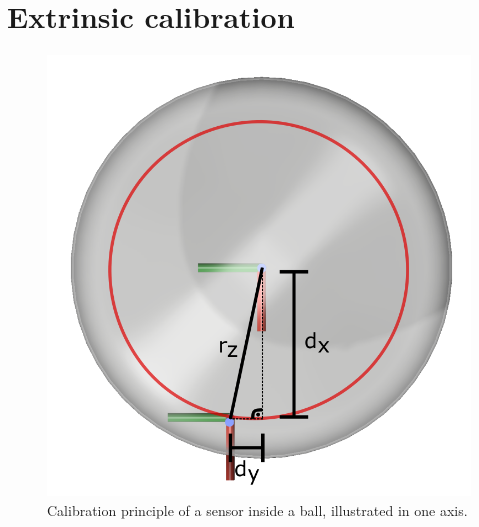 \section{Extrinsic calibration}

\begin{figure}
  \centering
  \includegraphics[width=.5\linewidth]{img/calibsphere}
  \caption{Calibration principle of a sensor inside a ball, illustrated in one axis.}
  \label{fig:calibsphere}
\end{figure}

